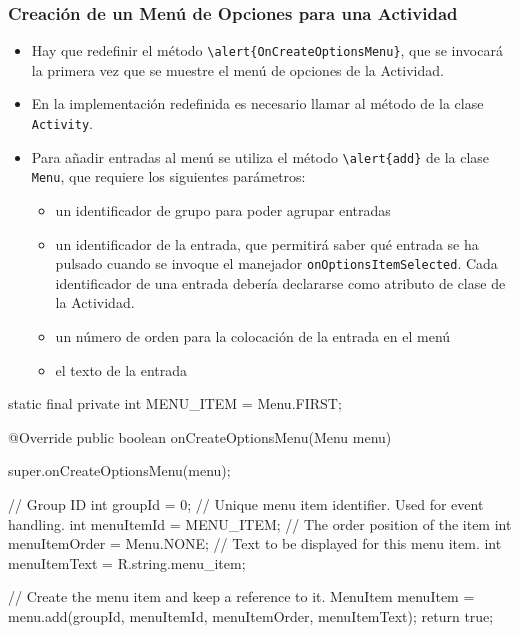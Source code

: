 \documentclass[hyperref={pdfpagelabels=true},ucs]{beamer}
\begin{document}
\begin{frame}[fragile,shrink=40]
\frametitle{Creación de un Menú de Opciones para una Actividad}

\begin{itemize}
\item Hay que redefinir el método
  \Verb|\alert{OnCreateOptionsMenu}|, que se invocará la primera vez
  que se muestre el menú de opciones de la Actividad.
\item En la implementación redefinida es necesario llamar al método
  de la clase \verb|Activity|.
\item Para añadir entradas al menú se utiliza el método \Verb|\alert{add}|
  de la clase \verb|Menu|, que requiere los siguientes parámetros:
  \begin{itemize}
  \item un identificador de grupo para poder agrupar entradas
  \item un identificador de la entrada, que permitirá saber qué
    entrada se ha pulsado cuando se invoque el manejador
    \verb|onOptionsItemSelected|. Cada identificador de una
    entrada debería declararse como atributo de clase de la
    Actividad.
  \item un número de orden para la colocación de la entrada en el
    menú
  \item el texto de la entrada
  \end{itemize}
\end{itemize}

\begin{scriptsize}
\begin{block}{}
\begin{java}
static final private int MENU_ITEM = Menu.FIRST;

@Override
public boolean onCreateOptionsMenu(Menu menu) {
  super.onCreateOptionsMenu(menu);

  // Group ID
  int groupId = 0;
  // Unique menu item identifier. Used for event handling.
  int menuItemId = MENU_ITEM;
  // The order position of the item
  int menuItemOrder = Menu.NONE;
  // Text to be displayed for this menu item.
  int menuItemText = R.string.menu_item;

  // Create the menu item and keep a reference to it.
  MenuItem menuItem = menu.add(groupId, menuItemId,
                               menuItemOrder, menuItemText);
  return true;
}
\end{java}
\end{block}
\end{scriptsize}


\end{frame}
\end{document}
